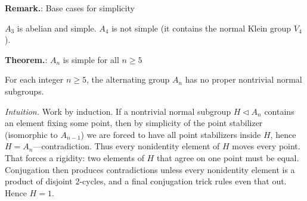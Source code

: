 \documentclass[12pt]{article}
\theoremstyle{definition}
\begin{document}
\newpage


\noindent\textbf{Remark.}: Base cases for simplicity

\newpage

$A_3$ is abelian and simple. $A_4$ is not simple (it contains the normal Klein group $V_4$).\\


\newpage


\noindent\textbf{Theorem.}: $A_n$ is simple for all $n\ge 5$

\newpage

For each integer $n\ge 5$, the alternating group $A_n$ has no proper nontrivial normal subgroups.\\

\dotfill

\emph{Intuition.} Work by induction. If a nontrivial normal subgroup $H\lhd A_n$ contains an element fixing some point, then by simplicity of the point stabilizer (isomorphic to $A_{n-1}$) we are forced to have all point stabilizers inside $H$, hence $H=A_n$—contradiction. Thus every nonidentity element of $H$ moves every point. That forces a rigidity: two elements of $H$ that agree on one point must be equal. Conjugation then produces contradictions unless every nonidentity element is a product of disjoint $2$-cycles, and a final conjugation trick rules even that out. Hence $H=1$.

\dotfill
\end{document}
